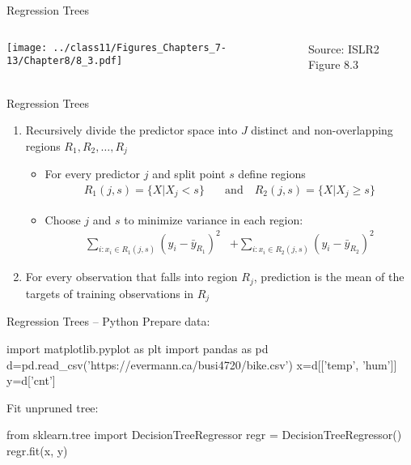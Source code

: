 \documentclass[ignorenonframetext,xcolor=x11names]{beamer}
\begin{document}
\begin{frame}{Regression Trees}
\begin{columns}
\begin{column}{.8\textwidth}
\texttt{[image: ../class11/Figures\_Chapters\_7-13/Chapter8/8\_3.pdf]} 
\end{column}
\begin{column}{.2\textwidth}
\scriptsize Source: ISLR2 Figure 8.3
\end{column}
\end{columns}
\end{frame}

\begin{frame}{Regression Trees}
\begin{enumerate}
   \item Recursively divide the predictor space into $J$ distinct and non-overlapping regions $R_1, R_2, \ldots, R_j$
   \begin{itemize}
   \vspace{\baselineskip}
       \item For every predictor $j$ and split point $s$ define regions
       \begin{align*}
       R_1(j,s) = \{X | X_j < s\} \quad &\text{and} \quad R_2(j, s) = \{X | X_j \geq s\}
       \end{align*}
       \item Choose $j$ and $s$ to minimize variance in each region:
       \begin{align*}
       \sum_{i: x_i \in R_1(j,s)} (y_i - \bar{y}_{R_1})^2 &+ \sum_{i: x_i \in R_2(j,s)} (y_i - \bar{y}_{R_2})^2
       \end{align*}
   \end{itemize}
   \item For every observation that falls into region $R_j$, prediction is the mean of the targets of training observations in $R_j$
\end{enumerate}
\end{frame}

\begin{frame}[fragile]{Regression Trees -- Python}
Prepare data:
\begin{pythoncode}
import matplotlib.pyplot as plt
import pandas as pd
d=pd.read_csv('https://evermann.ca/busi4720/bike.csv')
x=d[['temp', 'hum']]
y=d['cnt']
\end{pythoncode}
Fit unpruned tree:
\begin{pythoncode}
from sklearn.tree import DecisionTreeRegressor
regr = DecisionTreeRegressor()
regr.fit(x, y)
\end{pythoncode}
\end{frame}
\end{document}

